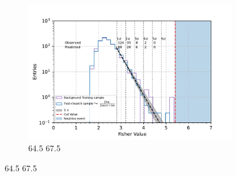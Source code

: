 \begin{figure}[h!]
\begin{subfigure}[l]{.48\textwidth}
      \includegraphics[width=\linewidth]{thesis_figures/Nu_analysis/Fisher_plots/Fisher_fit_search+test_bkg_region_64.5_67.5.pdf}
      \caption{64.5 67.5}
    \end{subfigure}


\end{figure}
